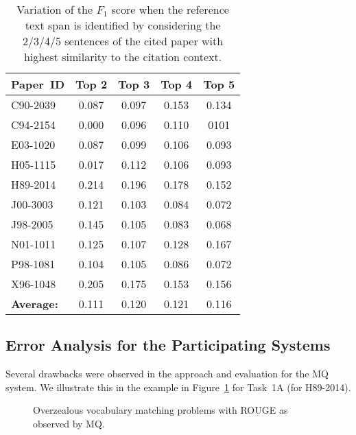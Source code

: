 \documentclass[11pt]{article}
\begin{document}
\begin{table}[h]\footnotesize
  \begin{center}
  \begin{tabular}{ | l | c | c | c | c | }
    \hline
    Paper~ID & Top 2 & Top 3 & Top 4 & Top 5 \\ \hline
    C90-2039 & 0.087 & 0.097 & 0.153 & 0.134 \\ \hline
    C94-2154 & 0.000 & 0.096 & 0.110 & 0101 \\ \hline
    E03-1020 & 0.087 & 0.099 & 0.106 & 0.093 \\ \hline
    H05-1115 & 0.017 & 0.112 & 0.106 & 0.093 \\ \hline
    H89-2014 & 0.214 & 0.196 & 0.178 & 0.152 \\ \hline
    J00-3003 & 0.121 & 0.103 & 0.084 & 0.072 \\ \hline
    J98-2005 & 0.145 & 0.105 & 0.083 & 0.068 \\ \hline
    N01-1011 & 0.125 & 0.107 & 0.128 & 0.167 \\ \hline
    P98-1081 & 0.104 & 0.105 & 0.086 & 0.072 \\ \hline
    X96-1048 & 0.205 & 0.175 & 0.153 & 0.156 \\ \hline
    \textbf{Average:}  & 0.111 & 0.120 & 0.121 & 0.116 \\ \hline
  \end{tabular}
  \caption{Variation of the $F_1$ score when the reference text span is identified by 
  considering the 2/3/4/5 sentences of the cited paper with highest similarity to
  the citation context.}
  \label{table:task1aEval}
  \end{center}
\end{table}


\subsection{Error Analysis for the Participating Systems}

Several drawbacks were observed in the approach and evaluation for the
MQ system. We illustrate this in the example in Figure~\ref{f:error1} for 
Task~1A (for H89-2014).


\begin{figure}[h]
\noindent{}
\label{f:error1}
\caption{Overzealous vocabulary matching problems with ROUGE as observed by MQ.}
\end{figure}
\end{document}
